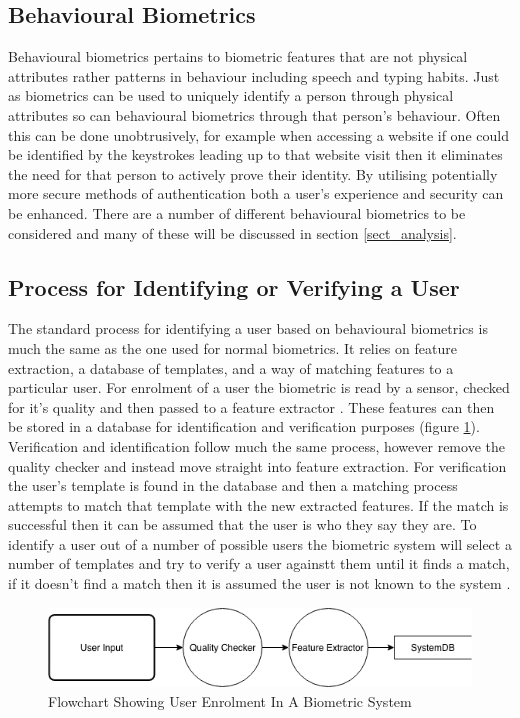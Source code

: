 \documentclass[12pt]{article}
\begin{document}
	\subsection{Behavioural Biometrics}
	\label{subsect_behavioral_biometrics}
	Behavioural biometrics pertains to biometric features that are not physical attributes rather patterns in behaviour including speech and typing habits. Just as biometrics can be used to uniquely identify a person through physical attributes so can behavioural biometrics through that person's behaviour. Often this can be done unobtrusively, for example when accessing a website if one could be identified by the keystrokes leading up to that website visit then it eliminates the need for that person to actively prove their identity. By utilising potentially more secure methods of authentication both a user's experience and security can be enhanced. There are a number of different behavioural biometrics to be considered and many of these will be discussed in section \ref{sect_analysis}.
	
	\subsection{Process for Identifying or Verifying a User}
	
	The standard process for identifying a user based on behavioural biometrics is much the same as the one used for normal biometrics. It relies on feature extraction, a database of templates, and a way of matching features to a particular user. For enrolment of a user the biometric is read by a sensor, checked for it's quality and then passed to a feature extractor \citep{jain2004introduction}. These features can then be stored in a database for identification and verification purposes (figure \ref{fig:flowchat:enrolment}). Verification and identification follow much the same process, however remove the quality checker and instead move straight into feature extraction. For verification the user's template is found in the database and then a matching process attempts to match that template with the new extracted features. If the match is successful then it can be assumed that the user is who they say they are. To identify a user out of a number of possible users the biometric system will select a number of templates and try to verify a user againstt them until it finds a match, if it doesn't find a match then it is assumed the user is not known to the system \citep{jain2004introduction}.
	
	\begin{figure}[H]
	    \centering
	    \includegraphics[width=\textwidth]{biometric_flowcharts-Enrolment.png}
	    \caption{Flowchart Showing User Enrolment In A Biometric System \citep{jain2004introduction}}
	    \label{fig:flowchat:enrolment}
	\end{figure}
	
\end{document}
